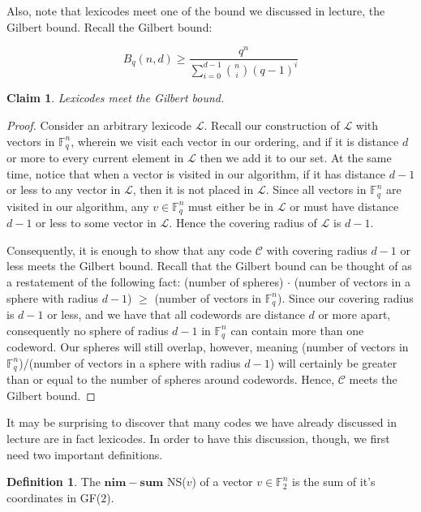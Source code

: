 \documentclass{article}
\theoremstyle{plain}
\newtheorem{claim}[theorem]{Claim}
\theoremstyle{definition}
\newtheorem{defn}[theorem]{Definition}
\begin{document}
Also, note that lexicodes meet one of the bound we discussed in lecture, the Gilbert bound.  Recall the Gilbert bound:

\begin{equation}
B_q(n,d) \ge \frac{q^n}{\sum_{i=0}^{d-1} \binom{n}{i}(q-1)^{i}}
\end{equation}

\begin{claim}
Lexicodes meet the Gilbert bound.
\end{claim}

\begin{proof}
Consider an arbitrary lexicode $\mathcal{L}$.  Recall our construction of $\mathcal{L}$ with vectors in $\mathbb{F}_q^n$, wherein we visit each vector in our ordering,
and if it is distance $d$ or more to every current element in $\mathcal{L}$ then we add it to our set.  At the same time, notice that when a vector is visited in our algorithm, 
if it has distance $d-1$ or less to any vector in $\mathcal{L}$, then it is not placed in $\mathcal{L}$.  Since all vectors in $\mathbb{F}_q^n$ are visited in our algorithm, any
$v \in \mathbb{F}_q^n$ must either be in $\mathcal{L}$ or must have distance $d-1$ or less to some vector in $\mathcal{L}$.  Hence the covering radius of $\mathcal{L}$ is $d-1$.  

Consequently, it is enough to show that any code $\mathcal{C}$ with covering radius $d-1$ or less meets the Gilbert bound.  Recall that the Gilbert bound can be thought of as a restatement of the 
following fact: (number of spheres) $\cdot$ (number of vectors in a sphere with radius $d-1$) $\ge$ (number of vectors in $\mathbb{F}_q^n$).  Since our covering radius
is $d-1$ or less, and we have that all codewords are distance $d$ or more apart, consequently no sphere of radius $d-1$ in $\mathbb{F}_q^n$ can contain more than one codeword.
Our spheres will still overlap, however, meaning (number of vectors in
$\mathbb{F}_q^n$)/(number of vectors in a sphere with radius $d-1$) will
certainly be greater than or equal to the number of spheres around codewords.
Hence, $\mathcal{C}$ meets the Gilbert bound.
\end{proof} 

It may be surprising to discover that many codes we have already discussed in lecture are in fact lexicodes.  In order to have this discussion, though, we
first need two important definitions.

\begin{defn}
The $\mathbf{nim-sum}$ NS($v$) of a vector $v \in \mathbb{F}_2^n$ is the sum of
it's coordinates in GF($2$).
\end{defn}
\end{document}
